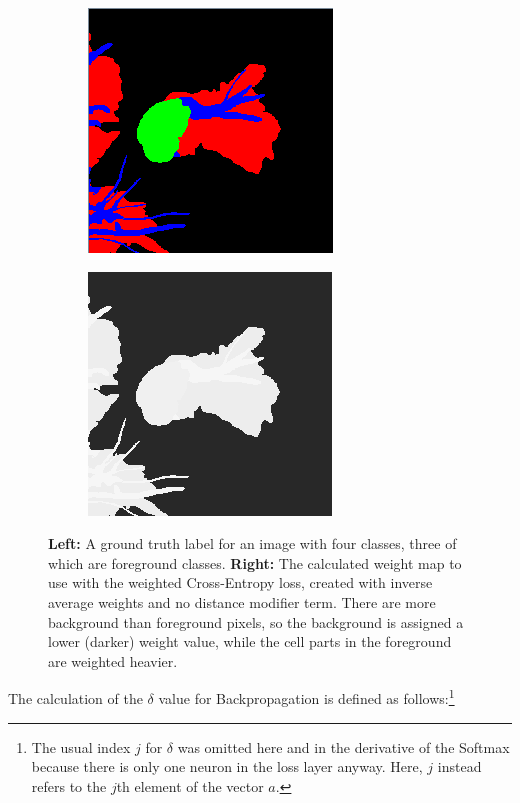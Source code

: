 \begin {figure}[!htb]
	\begin{center}
	\begin {subfigure}[b]{0.3\linewidth}
		\includegraphics{img/fig_weights_normal.png}
	\end {subfigure}\hspace{2.5cm}
	\begin {subfigure}[b]{0.3\linewidth}
		\includegraphics{img/fig_weights_weightmap.png}
	\end {subfigure}
	\end{center}

		\caption[The Cross-Entropy Loss weight map.]{\textbf{Left:} A ground truth label for an image with four classes, three of which are foreground classes. \textbf{Right:} The calculated weight map to use with the weighted Cross-Entropy loss, created with inverse average weights and no distance modifier term. There are more background than foreground pixels, so the background is assigned a lower (darker) weight value, while the cell parts in the foreground are weighted heavier.}
		\label{fig:weight_map}

\end {figure}

\noindent The calculation of the $\delta$ value for Backpropagation is defined as follows:\footnote{The usual index $j$ for $\delta$ was omitted here and in the derivative of the Softmax because there is only one neuron in the loss layer anyway. Here, $j$ instead refers to the $j$th element of the vector $a$.}


